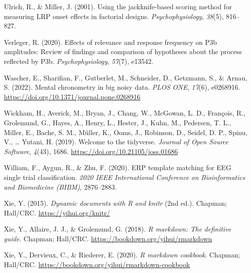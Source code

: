 \documentclass[
  man]{apa7}
\newlength{\cslhangindent}
\newlength{\cslentryspacingunit} %
\newenvironment{CSLReferences}[2] %
 {%
  \setlength{\parindent}{0pt}
  \ifodd #1
  \let\oldpar\par
  \def\par{\hangindent=\cslhangindent\oldpar}
  \fi
  \setlength{\parskip}{#2\cslentryspacingunit}
 }%
 {}
\begin{document}
\begin{CSLReferences}{1}{0}
\leavevmode{}%
Ulrich, R., \& Miller, J. (2001). Using the jackknife-based scoring method for measuring {LRP} onset effects in factorial designs. \emph{Psychophysiology}, \emph{38}(5), 816--827.

\leavevmode{}%
Verleger, R. (2020). Effects of relevance and response frequency on {P3b} amplitudes: {Review} of findings and comparison of hypotheses about the process reflected by {P3b}. \emph{Psychophysiology}, \emph{57}(7), e13542.

\leavevmode{}%
Wascher, E., Sharifian, F., Gutberlet, M., Schneider, D., Getzmann, S., \& Arnau, S. (2022). Mental chronometry in big noisy data. \emph{PLOS ONE}, \emph{17}(6), e0268916. \url{https://doi.org/10.1371/journal.pone.0268916}

\leavevmode{}%
Wickham, H., Averick, M., Bryan, J., Chang, W., McGowan, L. D., François, R., Grolemund, G., Hayes, A., Henry, L., Hester, J., Kuhn, M., Pedersen, T. L., Miller, E., Bache, S. M., Müller, K., Ooms, J., Robinson, D., Seidel, D. P., Spinu, V., \ldots{} Yutani, H. (2019). Welcome to the {tidyverse}. \emph{Journal of Open Source Software}, \emph{4}(43), 1686. \url{https://doi.org/10.21105/joss.01686}

\leavevmode{}%
William, F., Aygun, R., \& Zhu, F. (2020). {ERP} template matching for {EEG} single trial classification. \emph{2020 {IEEE} International Conference on Bioinformatics and Biomedicine ({BIBM})}, 2876--2883.

\leavevmode{}%
Xie, Y. (2015). \emph{Dynamic documents with {R} and knitr} (2nd ed.). Chapman; Hall/CRC. \url{https://yihui.org/knitr/}

\leavevmode{}%
Xie, Y., Allaire, J. J., \& Grolemund, G. (2018). \emph{R markdown: The definitive guide}. Chapman; Hall/CRC. \url{https://bookdown.org/yihui/rmarkdown}

\leavevmode{}%
Xie, Y., Dervieux, C., \& Riederer, E. (2020). \emph{R markdown cookbook}. Chapman; Hall/CRC. \url{https://bookdown.org/yihui/rmarkdown-cookbook}

\end{CSLReferences}
\end{document}
